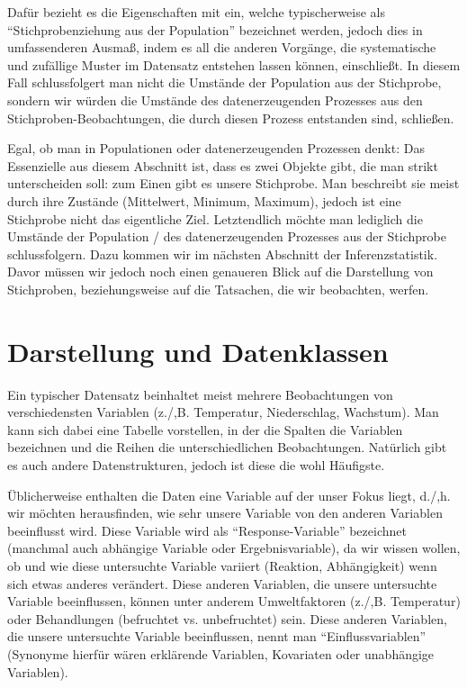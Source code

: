 \documentclass[a4paper,twoside]{tufte-book}\usepackage[]{graphicx}\usepackage[]{color}
\begin{document}
	  Dafür bezieht es die Eigenschaften mit ein, welche typischerweise als "`Stichprobenziehung aus der Population"' bezeichnet werden, jedoch dies in umfassenderen Ausmaß, indem es all die anderen Vorgänge, die systematische und zufällige Muster im Datensatz entstehen lassen können, einschließt. In diesem Fall schlussfolgert man nicht die Umstände der Population aus der Stichprobe, sondern wir würden die Umstände des datenerzeugenden Prozesses aus den Stichproben-Beobachtungen, die durch diesen Prozess entstanden sind, schließen. 
	
	Egal, ob man in Populationen oder datenerzeugenden Prozessen denkt: Das Essenzielle aus diesem Abschnitt ist, dass es zwei Objekte gibt, die man strikt unterscheiden soll: zum Einen gibt es unsere Stichprobe. Man beschreibt sie meist durch ihre Zustände (Mittelwert, Minimum, Maximum), jedoch ist eine Stichprobe nicht das eigentliche Ziel. Letztendlich möchte man lediglich die Umstände der Population / des datenerzeugenden Prozesses aus der Stichprobe schlussfolgern. Dazu kommen wir im nächsten Abschnitt der Inferenzstatistik. Davor müssen wir jedoch noch einen genaueren Blick auf die Darstellung von Stichproben, beziehungsweise auf die Tatsachen, die wir beobachten, werfen.
	
	\section{Darstellung und Datenklassen}
	
	Ein typischer Datensatz beinhaltet meist mehrere Beobachtungen von verschiedensten Variablen (z./,B. Temperatur, Niederschlag, Wachstum). Man kann sich dabei eine Tabelle vorstellen, in der die Spalten die Variablen bezeichnen und die Reihen die unterschiedlichen Beobachtungen. Natürlich gibt es auch andere Datenstrukturen, jedoch ist diese die wohl Häufigste.
	
	Üblicherweise enthalten die Daten eine Variable auf der unser Fokus liegt, d./,h. wir möchten herausfinden, wie sehr unsere Variable von den anderen Variablen beeinflusst wird.   Diese Variable wird als ``Response-Variable'' bezeichnet (manchmal auch abhängige Variable oder Ergebnisvariable), da wir wissen wollen, ob und wie diese untersuchte Variable variiert (Reaktion, Abhängigkeit) wenn sich etwas anderes verändert. Diese anderen Variablen, die unsere untersuchte Variable beeinflussen, können unter anderem Umweltfaktoren (z./,B. Temperatur) oder Behandlungen (befruchtet vs. unbefruchtet) sein.  Diese anderen Variablen, die unsere untersuchte Variable beeinflussen, nennt man ``Einflussvariablen'' (Synonyme hierfür wären erklärende Variablen, Kovariaten oder unabhängige Variablen). 
	
\end{document}
